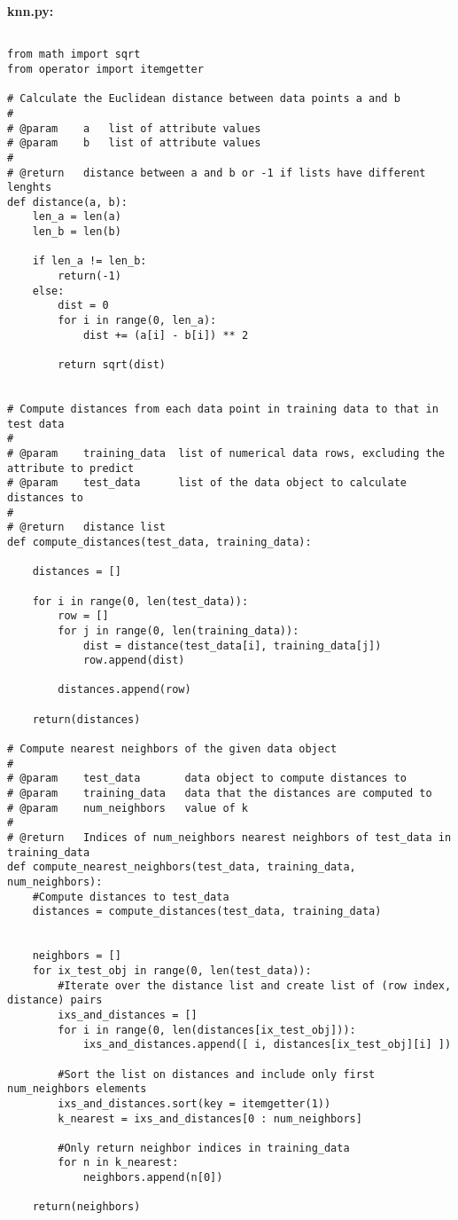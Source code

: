 \documentclass[a4paper]{article}
\begin{document}
\vspace*{1cm}
\normalsize
\textbf{knn.py:}\\
\footnotesize
\begin{lstlisting}

from math import sqrt
from operator import itemgetter

# Calculate the Euclidean distance between data points a and b
#
# @param    a   list of attribute values
# @param    b   list of attribute values
#
# @return   distance between a and b or -1 if lists have different lenghts 
def distance(a, b):
    len_a = len(a)
    len_b = len(b)
    
    if len_a != len_b:
        return(-1)
    else:
        dist = 0
        for i in range(0, len_a):
            dist += (a[i] - b[i]) ** 2

        return sqrt(dist)


# Compute distances from each data point in training data to that in test data
#
# @param    training_data  list of numerical data rows, excluding the attribute to predict
# @param    test_data      list of the data object to calculate distances to
#
# @return   distance list
def compute_distances(test_data, training_data):

    distances = []
    
    for i in range(0, len(test_data)):
        row = []
        for j in range(0, len(training_data)):
            dist = distance(test_data[i], training_data[j])
            row.append(dist)

        distances.append(row)

    return(distances)

# Compute nearest neighbors of the given data object
#
# @param    test_data       data object to compute distances to
# @param    training_data   data that the distances are computed to
# @param    num_neighbors   value of k
#
# @return   Indices of num_neighbors nearest neighbors of test_data in training_data
def compute_nearest_neighbors(test_data, training_data, num_neighbors):
    #Compute distances to test_data
    distances = compute_distances(test_data, training_data)
    

    neighbors = []
    for ix_test_obj in range(0, len(test_data)):
        #Iterate over the distance list and create list of (row index, distance) pairs
        ixs_and_distances = []
        for i in range(0, len(distances[ix_test_obj])):
            ixs_and_distances.append([ i, distances[ix_test_obj][i] ])

        #Sort the list on distances and include only first num_neighbors elements
        ixs_and_distances.sort(key = itemgetter(1))
        k_nearest = ixs_and_distances[0 : num_neighbors]

        #Only return neighbor indices in training_data
        for n in k_nearest:
            neighbors.append(n[0])

    return(neighbors)


\end{lstlisting}
\end{document}

